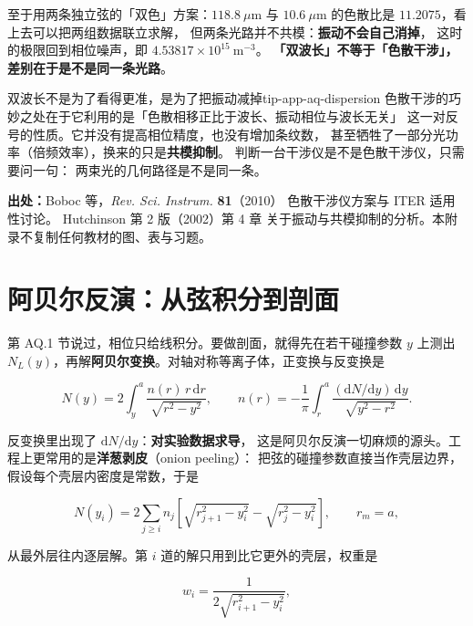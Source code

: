 至于用两条独立弦的「双色」方案：$118.8\ \mu\mathrm{m}$ 与 $10.6\ \mu\mathrm{m}$
的色散比是 $11.2075$，看上去可以把两组数据联立求解，
但两条光路并不共模：\textbf{振动不会自己消掉}，
这时的极限回到相位噪声，即 $4.53817\times10^{15}\ \mathrm{m^{-3}}$。
\textbf{「双波长」不等于「色散干涉」，
差别在于是不是同一条光路}。

\begin{tip}{双波长不是为了看得更准，是为了把振动减掉}{tip-app-aq-dispersion}
色散干涉的巧妙之处在于它利用的是「色散相移正比于波长、振动相位与波长无关」
这一对反号的性质。它并没有提高相位精度，也没有增加条纹数，
甚至牺牲了一部分光功率（倍频效率），换来的只是\textbf{共模抑制}。
判断一台干涉仪是不是色散干涉仪，只需要问一句：
两束光的几何路径是不是同一条。
\end{tip}

{\footnotesize
\textbf{出处：}Boboc 等，\textit{Rev. Sci. Instrum.} \textbf{81}（2010）
色散干涉仪方案与 ITER 适用性讨论。
Hutchinson 第 2 版（2002）第 4 章
关于振动与共模抑制的分析。本附录不复制任何教材的图、表与习题。
\section{阿贝尔反演：从弦积分到剖面}
\label{sec:app-aq-abel}
}

第 AQ.1 节说过，相位只给线积分。要做剖面，就得先在若干碰撞参数 $y$ 上测出
$N_L(y)$，再解\textbf{阿贝尔变换}。对轴对称等离子体，正变换与反变换是

\begin{equation}
N(y) = 2\int_{y}^{a}\frac{n(r)\,r\,\mathrm{d}r}{\sqrt{r^2-y^2}},
\qquad
n(r) = -\frac{1}{\pi}\int_{r}^{a}\frac{(\mathrm{d}N/\mathrm{d}y)\,\mathrm{d}y}{\sqrt{y^2-r^2}}.
\label{eq:app-aq-abel}
\end{equation}

反变换里出现了 $\mathrm{d}N/\mathrm{d}y$：\textbf{对实验数据求导}，
这是阿贝尔反演一切麻烦的源头。工程上更常用的是\textbf{洋葱剥皮}（onion peeling）：
把弦的碰撞参数直接当作壳层边界，假设每个壳层内密度是常数，于是

\begin{equation}
N(y_i) = 2\sum_{j\ge i} n_j\left[\sqrt{r_{j+1}^2-y_i^2} - \sqrt{r_j^2-y_i^2}\right],
\qquad r_m = a,
\label{eq:app-aq-peel}
\end{equation}

从最外层往内逐层解。第 $i$ 道的解只用到比它更外的壳层，权重是

\begin{equation}
w_i = \frac{1}{2\sqrt{r_{i+1}^2-y_i^2}},
\label{eq:app-aq-weight}
\end{equation}

